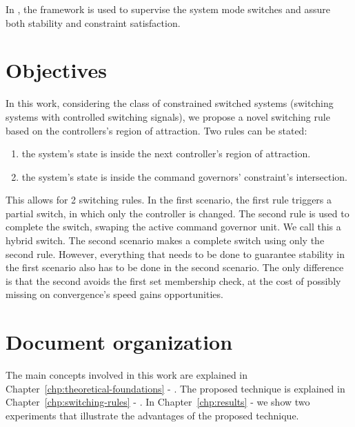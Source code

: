 In \parencite{franzè.lucia.ea:command,lucia.franzè:stabilization}, the \CG{}
framework is used to supervise the system mode switches and assure both
stability and constraint satisfaction.

\section{Objectives}%
\label{sec:objectives}

In this work, considering the class of constrained switched systems (switching
systems with controlled switching signals), we propose a novel switching rule
based on the controllers's region of attraction. Two rules can be stated:

\begin{enumerate}
  \item the system's state is inside the next controller's region of attraction.
  \item the system's state is inside the command governors' constraint's
        intersection.
\end{enumerate}

This allows for 2 switching rules. In the first scenario, the first rule
triggers a partial switch, in which only the controller is changed. The second
rule is used to complete the switch, swaping the active command governor unit.
We call this a hybrid switch. The second scenario makes a complete switch using
only the second rule. However, everything that needs to be done to guarantee
stability in the first scenario also has to be done in the second scenario. The
only difference is that the second avoids the first set membership check, at the
cost of possibly missing on convergence's speed gains opportunities.

\section{Document organization}%
\label{sec:organization}

The main concepts involved in this work are explained in
Chapter~\ref{chp:theoretical-foundations} -
. The proposed technique is explained in
Chapter~\ref{chp:switching-rules} - . In
Chapter~\ref{chp:results} -  we show two experiments that
illustrate the advantages of the proposed technique.
